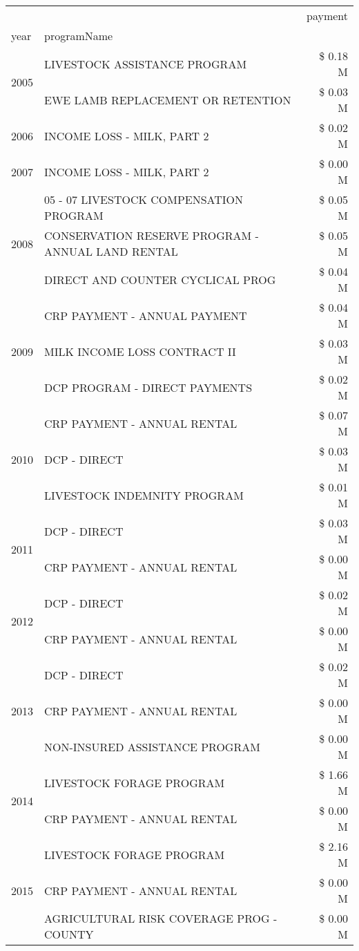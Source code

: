 \begin{tabular}{llr}
\toprule
 &  & payment \\
year & programName &  \\
\midrule
\multirow[t]{2}{*}{2005} & LIVESTOCK ASSISTANCE PROGRAM & \$ 0.18 M \\
 & EWE LAMB REPLACEMENT OR RETENTION & \$ 0.03 M \\
\cline{1-3}
2006 & INCOME LOSS - MILK, PART 2 & \$ 0.02 M \\
\cline{1-3}
2007 & INCOME LOSS - MILK, PART 2 & \$ 0.00 M \\
\cline{1-3}
\multirow[t]{3}{*}{2008} & 05 - 07 LIVESTOCK COMPENSATION PROGRAM & \$ 0.05 M \\
 & CONSERVATION RESERVE PROGRAM - ANNUAL LAND RENTAL & \$ 0.05 M \\
 & DIRECT AND COUNTER CYCLICAL PROG & \$ 0.04 M \\
\cline{1-3}
\multirow[t]{3}{*}{2009} & CRP PAYMENT - ANNUAL PAYMENT & \$ 0.04 M \\
 & MILK INCOME LOSS CONTRACT II & \$ 0.03 M \\
 & DCP PROGRAM - DIRECT PAYMENTS & \$ 0.02 M \\
\cline{1-3}
\multirow[t]{3}{*}{2010} & CRP PAYMENT - ANNUAL RENTAL & \$ 0.07 M \\
 & DCP - DIRECT & \$ 0.03 M \\
 & LIVESTOCK INDEMNITY PROGRAM & \$ 0.01 M \\
\cline{1-3}
\multirow[t]{2}{*}{2011} & DCP - DIRECT & \$ 0.03 M \\
 & CRP PAYMENT - ANNUAL RENTAL & \$ 0.00 M \\
\cline{1-3}
\multirow[t]{2}{*}{2012} & DCP - DIRECT & \$ 0.02 M \\
 & CRP PAYMENT - ANNUAL RENTAL & \$ 0.00 M \\
\cline{1-3}
\multirow[t]{3}{*}{2013} & DCP - DIRECT & \$ 0.02 M \\
 & CRP PAYMENT - ANNUAL RENTAL & \$ 0.00 M \\
 & NON-INSURED ASSISTANCE PROGRAM & \$ 0.00 M \\
\cline{1-3}
\multirow[t]{2}{*}{2014} & LIVESTOCK FORAGE PROGRAM & \$ 1.66 M \\
 & CRP PAYMENT - ANNUAL RENTAL & \$ 0.00 M \\
\cline{1-3}
\multirow[t]{3}{*}{2015} & LIVESTOCK FORAGE PROGRAM & \$ 2.16 M \\
 & CRP PAYMENT - ANNUAL RENTAL & \$ 0.00 M \\
 & AGRICULTURAL RISK COVERAGE PROG - COUNTY & \$ 0.00 M \\

\end{tabular}
